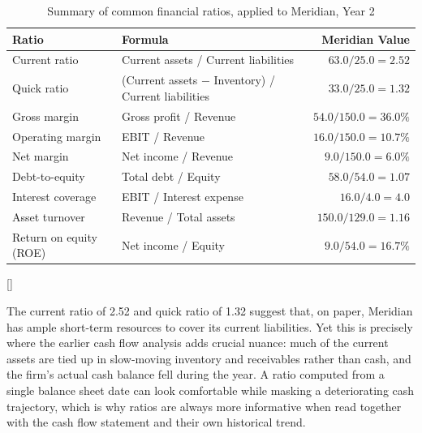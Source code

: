 \documentclass[../ai_in_finance]{subfiles}
\begin{document}
\begin{table}[htbp]
\centering
\begin{lrbox}{\bookmeasuredbox}
\begin{tabular}{p{3.8cm}p{5.4cm}r}
\toprule
Ratio & Formula & Meridian Value \\
\midrule
Current ratio & Current assets / Current liabilities & $63.0/25.0 = 2.52$ \\
Quick ratio & (Current assets $-$ Inventory) / Current liabilities & $33.0/25.0 = 1.32$ \\
Gross margin & Gross profit / Revenue & $54.0/150.0 = 36.0\%$ \\
Operating margin & EBIT / Revenue & $16.0/150.0 = 10.7\%$ \\
Net margin & Net income / Revenue & $9.0/150.0 = 6.0\%$ \\
Debt-to-equity & Total debt / Equity & $58.0/54.0 = 1.07$ \\
Interest coverage & EBIT / Interest expense & $16.0/4.0 = 4.0$ \\
Asset turnover & Revenue / Total assets & $150.0/129.0 = 1.16$ \\
Return on equity (ROE) & Net income / Equity & $9.0/54.0 = 16.7\%$ \\
\bottomrule
\end{tabular}
\end{lrbox}
\ifdim\wd\bookmeasuredbox<0.65\linewidth
\setlength{\bookcapwidth}{0.65\linewidth}
\else
\setlength{\bookcapwidth}{\wd\bookmeasuredbox}
\fi
{}[\bookcapwidth]{
\usebox{\bookmeasuredbox}
}{
\caption{Summary of common financial ratios, applied to Meridian, Year 2}
\label{tab:ratio_summary}
}
\end{table}

The current ratio of 2.52 and quick ratio of 1.32 suggest that, on paper, Meridian has ample short-term resources to cover its current liabilities. Yet this is precisely where the earlier cash flow analysis adds crucial nuance: much of the current assets are tied up in slow-moving inventory and receivables rather than cash, and the firm's actual cash balance fell during the year. A ratio computed from a single balance sheet date can look comfortable while masking a deteriorating cash trajectory, which is why ratios are always more informative when read together with the cash flow statement and their own historical trend.
\end{document}
